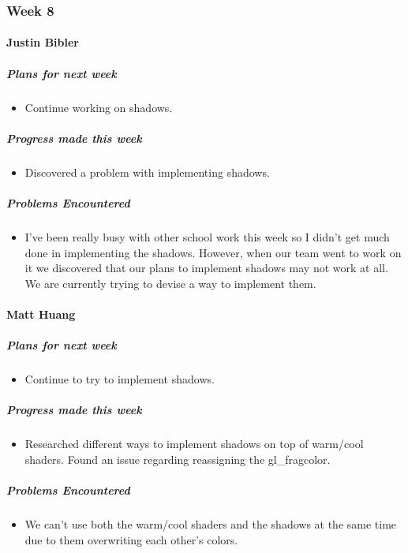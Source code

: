 {
\subsubsection{Week 8}
\paragraph{Justin Bibler}
\subparagraph{Plans for next week}
\begin{itemize}
  \item Continue working on shadows.
\end{itemize}

\subparagraph{Progress made this week}
\begin{itemize}
  \item Discovered a problem with implementing shadows.
\end{itemize}

\subparagraph{Problems Encountered}
\begin{itemize}
  \item I've been really busy with other school work this week so I didn't get much done in implementing the shadows. However, when our team went to work on it we discovered that our plans to implement shadows may not work at all. We are currently trying to devise a way to implement them.
\end{itemize}
\vspace{3mm}

\paragraph{Matt Huang}
\subparagraph{Plans for next week}
\begin{itemize}
  \item Continue to try to implement shadows.
\end{itemize}

\subparagraph{Progress made this week}
\begin{itemize}
  \item Researched different ways to implement shadows on top of warm/cool shaders. Found an issue regarding reassigning the gl\_fragcolor.
\end{itemize}

\subparagraph{Problems Encountered}
\begin{itemize}
  \item We can't use both the warm/cool shaders and the shadows at the same time due to them overwriting each other's colors.
\end{itemize}
\vspace{3mm}

}
